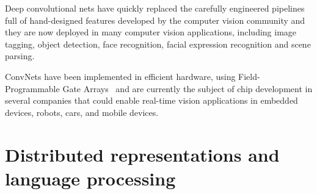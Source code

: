 \documentclass[10pts]{article}
\begin{document}
Deep convolutional nets have quickly replaced the carefully engineered
pipelines full of hand-designed features developed by the computer
vision community and they are now deployed in many computer vision
applications, including image tagging, object detection, face
recognition, facial expression recognition and scene parsing.

ConvNets have been implemented in efficient hardware, using
Field-Programmable Gate Arrays~\citep{farabet-suml-11} and are
currently the subject of chip development in several companies that
could enable real-time vision applications in embedded devices,
robots, cars, and mobile devices.



\section{Distributed representations and language processing}
\end{document}
